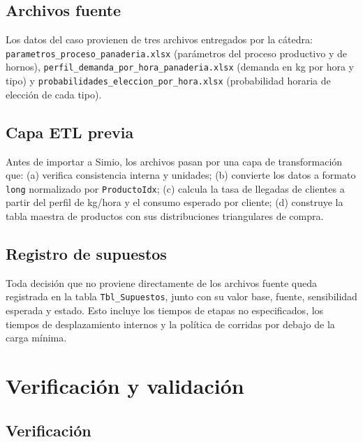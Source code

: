 \documentclass[12pt]{article}
\begin{document}
\subsection{Archivos fuente}

Los datos del caso provienen de tres archivos entregados por la cátedra: \texttt{parametros\_proceso\_panaderia.xlsx} (parámetros del proceso productivo y de hornos), \texttt{perfil\_demanda\_por\_hora\_panaderia.xlsx} (demanda en kg por hora y tipo) y \texttt{probabilidades\_eleccion\_por\_hora.xlsx} (probabilidad horaria de elección de cada tipo).

\subsection{Capa ETL previa}

Antes de importar a Simio, los archivos pasan por una capa de transformación que: (a) verifica consistencia interna y unidades; (b) convierte los datos a formato \texttt{long} normalizado por \texttt{ProductoIdx}; (c) calcula la tasa de llegadas de clientes a partir del perfil de kg/hora y el consumo esperado por cliente; (d) construye la tabla maestra de productos con sus distribuciones triangulares de compra.

\subsection{Registro de supuestos}

Toda decisión que no proviene directamente de los archivos fuente queda registrada en la tabla \texttt{Tbl\_Supuestos}, junto con su valor base, fuente, sensibilidad esperada y estado. Esto incluye los tiempos de etapas no especificados, los tiempos de desplazamiento internos y la política de corridas por debajo de la carga mínima.

\newpage
\section{Verificación y validación}

\subsection{Verificación}
\end{document}
